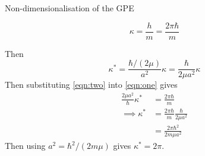 
\begin{chapter}{\label{cha:nondim}Non-dimensionalisation of the GPE}

  \begin{equation}
    \kappa = \frac{h}{m} = \frac{2\pi\hbar}{m}
    \label{eqn:one}
  \end{equation}

  \noindent Then
  \begin{equation}
    \kappa^{*} = \frac{\hbar/(2\mu)}{a^{2}}\kappa = \frac{\hbar}{2\mu
      a^{2}}\kappa
    \label{eqn:two}
  \end{equation}
  Then substituting \eqref{eqn:two} into \eqref{eqn:one} gives
  \begin{equation*}
    \begin{aligned}
      \frac{2\mu a^{2}}{\hbar}\kappa^{*} &= \frac{2\pi\hbar}{m} \\
      \implies \kappa^{*} &= \frac{2\pi\hbar}{m} \frac{\hbar}{2\mu a^{2}} \\
      &= \frac{2\pi\hbar^{2}}{2m\mu a^{2}}
    \end{aligned}
  \end{equation*}
  Then using $a^{2} = \hbar^{2}/(2m\mu)$ gives $\kappa^{*} = 2\pi$.
\end{chapter}
